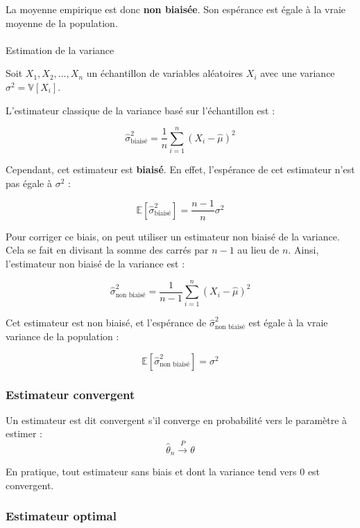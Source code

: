 \documentclass[
  letterpaper,
  DIV=11,
  numbers=noendperiod]{scrartcl}
\makeatletter
\let\oldparagraph\paragraph
\renewcommand{\paragraph}{
    \@ifstar
      \xxxParagraphStar
      \xxxParagraphNoStar
  }
\newcommand{\xxxParagraphStar}[1]{\oldparagraph*{#1}\mbox{}}
\newcommand{\xxxParagraphNoStar}[1]{\oldparagraph{#1}\mbox{}}
\makeatother
\begin{document}
La moyenne empirique est donc \textbf{non biaisée}. Son espérance est
égale à la vraie moyenne de la population.

\paragraph{Estimation de la variance}\label{estimation-de-la-variance}

Soit \(X_1, X_2, \dots, X_n\) un échantillon de variables aléatoires
\(X_i\) avec une variance \(\sigma^2 = \mathbb{V}[X_i]\).

L'estimateur classique de la variance basé sur l'échantillon est :

\[
\hat{\sigma}^2_{\text{biaisé}} = \frac{1}{n} \sum_{i=1}^{n} (X_i - \hat{\mu})^2
\]

Cependant, cet estimateur est \textbf{biaisé}. En effet, l'espérance de
cet estimateur n'est pas égale à \(\sigma^2\) :

\[
\mathbb{E}[\hat{\sigma}^2_{\text{biaisé}}] = \frac{n-1}{n} \sigma^2
\]

Pour corriger ce biais, on peut utiliser un estimateur non biaisé de la
variance. Cela se fait en divisant la somme des carrés par \(n - 1\) au
lieu de \(n\). Ainsi, l'estimateur non biaisé de la variance est :

\[
\hat{\sigma}^2_{\text{non biaisé}} = \frac{1}{n - 1} \sum_{i=1}^{n} (X_i - \hat{\mu})^2
\]

Cet estimateur est non biaisé, et l'espérance de
\(\hat{\sigma}^2_{\text{non biaisé}}\) est égale à la vraie variance de
la population :

\[
\mathbb{E}[\hat{\sigma}^2_{\text{non biaisé}}] = \sigma^2
\]

\subsubsection{Estimateur convergent}\label{estimateur-convergent}

Un estimateur est dit convergent s'il converge en probabilité vers le
paramètre à estimer : \[\hat{\theta}_n \xrightarrow{P} \theta\]

En pratique, tout estimateur sans biais et dont la variance tend vers 0
est convergent.

\subsubsection{Estimateur optimal}\label{estimateur-optimal}
\end{document}
